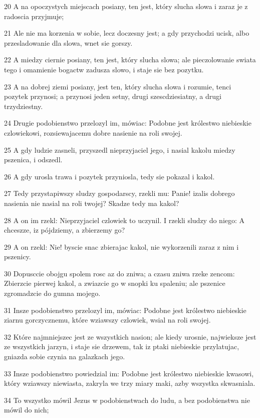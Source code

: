 \par 20 A na opoczystych miejscach posiany, ten jest, który slucha slowa i zaraz je z radoscia przyjmuje;
\par 21 Ale nie ma korzenia w sobie, lecz doczesny jest; a gdy przychodzi ucisk, albo przesladowanie dla slowa, wnet sie gorszy.
\par 22 A miedzy ciernie posiany, ten jest, który slucha slowa; ale pieczolowanie swiata tego i omamienie bogactw zadusza slowo, i staje sie bez pozytku.
\par 23 A na dobrej ziemi posiany, jest ten, który slucha slowa i rozumie, tenci pozytek przynosi; a przynosi jeden setny, drugi szescdziesiatny, a drugi trzydziestny.
\par 24 Drugie podobienstwo przelozyl im, mówiac: Podobne jest królestwo niebieskie czlowiekowi, rozsiewajacemu dobre nasienie na roli swojej.
\par 25 A gdy ludzie zasneli, przyszedl nieprzyjaciel jego, i nasial kakolu miedzy pszenica, i odszedl.
\par 26 A gdy urosla trawa i pozytek przyniosla, tedy sie pokazal i kakol.
\par 27 Tedy przystapiwszy sludzy gospodarscy, rzekli mu: Panie! izalis dobrego nasienia nie nasial na roli twojej? Skadze tedy ma kakol?
\par 28 A on im rzekl: Nieprzyjaciel czlowiek to uczynil. I rzekli sludzy do niego: A chceszze, iz pójdziemy, a zbierzemy go?
\par 29 A on rzekl: Nie! byscie snac zbierajac kakol, nie wykorzenili zaraz z nim i pszenicy.
\par 30 Dopusccie obojgu spolem rosc az do zniwa; a czasu zniwa rzeke zencom: Zbierzcie pierwej kakol, a zwiazcie go w snopki ku spaleniu; ale pszenice zgromadzcie do gumna mojego.
\par 31 Insze podobienstwo przelozyl im, mówiac: Podobne jest królestwo niebieskie ziarnu gorczycznemu, które wziawszy czlowiek, wsial na roli swojej.
\par 32 Które najmniejszec jest ze wszystkich nasion; ale kiedy urosnie, najwieksze jest ze wszystkich jarzyn, i staje sie drzewem, tak iz ptaki niebieskie przylatujac, gniazda sobie czynia na galazkach jego.
\par 33 Insze podobienstwo powiedzial im: Podobne jest królestwo niebieskie kwasowi, który wziawszy niewiasta, zakryla we trzy miary maki, azby wszystka skwasniala.
\par 34 To wszystko mówil Jezus w podobienstwach do ludu, a bez podobienstwa nie mówil do nich;
